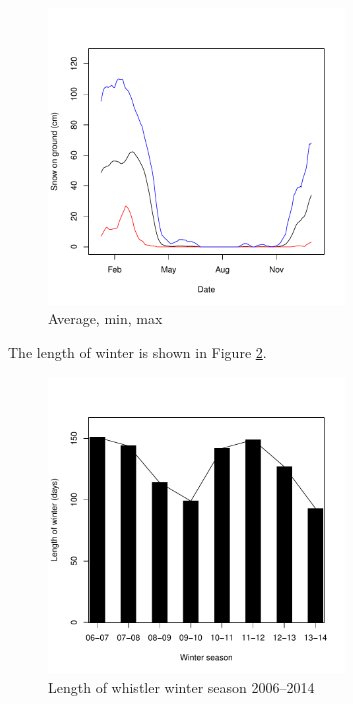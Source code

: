 \documentclass[12pt,twoside]{article}
\begin{document}
{\begin{figure}[!ht]
\begin{center}
\includegraphics[width=0.7\textwidth]{report-averagetsplot}
\end{center}
\caption{Average, min, max}
\label{fig:averagetsplot}
\end{figure}

The length of winter is shown in Figure \ref{fig:lengthwinter}. \lipsum[4]


\begin{figure}[!ht]
\begin{center}
\includegraphics[width=0.7\textwidth]{report-lengthwinter}
\end{center}
\caption{Length of whistler winter season 2006--2014}
\label{fig:lengthwinter}
\end{figure}

}
\end{document}
